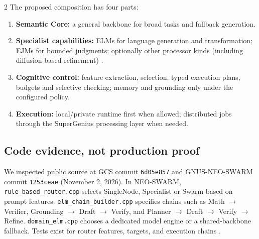 \documentclass[10pt,letterpaper]{article}
\newcommand{\code}[1]{\texttt{#1}}
\begin{document}
\begin{multicols}{2}
The proposed composition has four parts:
\begin{enumerate}
\item \textbf{Semantic Core:} a general backbone for broad tasks and fallback generation.
\item \textbf{Specialist capabilities:} ELMs for language generation and transformation; EJMs for bounded judgments; optionally other processor kinds (including diffusion-based refinement) \cite{gcsrouter}.
\item \textbf{Cognitive control:} feature extraction, selection, typed execution plans, budgets and selective checking; memory and grounding only under the configured policy.
\item \textbf{Execution:} local/private runtime first when allowed; distributed jobs through the SuperGenius processing layer when needed.
\end{enumerate}

\begin{center}
\end{center}

\subsection{Code evidence, not production proof}
We inspected public source at GCS commit \code{6d05e857} and GNUS-NEO-SWARM commit \code{1253ceae} (November 2, 2026). In NEO-SWARM, \code{rule\_based\_router.cpp} selects SingleNode, Specialist or Swarm based on prompt features. \code{elm\_chain\_builder.cpp} specifies chains such as Math $\to$ Verifier, Grounding $\to$ Draft $\to$ Verify, and Planner $\to$ Draft $\to$ Verify $\to$ Refine. \code{domain\_elm.cpp} chooses a dedicated model engine or a shared-backbone fallback. Tests exist for router features, targets, and execution chains \cite{neoswarmrouter,neoswarmchain,neoswarmdomain}.


\end{multicols}
\end{document}
